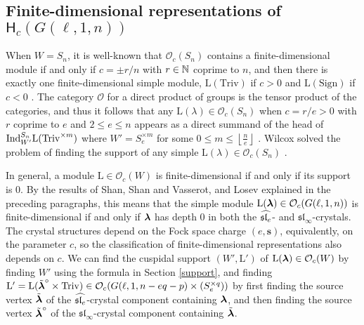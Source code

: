 \documentclass[12pt]{amsart}
\numberwithin{equation}{section}
\theoremstyle{definition}
\newcommand{\oh}{\mathcal{O}}
\newcommand{\el}{\mathrm{L}}
\newcommand{\slinf}{\mathfrak{sl}_\infty}
\newcommand{\mbs}{\mathbf{s}}
\newcommand{\triv}{\mathrm{Triv}}
\begin{document}
\subsection{Finite-dimensional representations of $\mathsf{H}_c(G(\ell,1,n))$}\label{findim}
When $W=S_n$, it is well-known that $\oh_c(S_n)$ contains a finite-dimensional module if and only if $c=\pm r/n$ with $r\in\mathbb{N}$ coprime to $n$, and then there is exactly one finite-dimensional simple module, $\el(\triv)$ if $c>0$ and $\el(\mathrm{Sign})$ if $c<0$ \cite{BEG}. The category $\oh$ for a direct product of groups is the tensor product of the categories, and thus it follows that any $\el(\lambda)\in\oh_c(S_n)$ when $c=r/e>0$ with $r$ coprime to $e$ and $2\leq e\leq n$ appears as a direct summand of the head of $\Ind_{W'}^{S_n}\el(\triv^{\times m})$ where $W'=S_e^{\times m}$ for some $0\leq m\leq \left\lfloor\frac{n}{e}\right\rfloor$ \cite{BezrukavnikovEtingof}. %
Wilcox solved the problem of finding the support of any simple $\el(\lambda)\in\oh_c(S_n)$ \cite{Wilcox}.

In general, a module $\el\in\oh_c(W)$ is finite-dimensional if and only if its support is $0$. By the results of Shan, Shan and Vasserot, and Losev explained in the preceding paragraphs, this means that the simple module $\el(\bla)\in\oh_c(G(\ell,1,n))$ is finite-dimensional if and only if $\boldsymbol{\lambda}$ has depth $0$ in both the $\widehat{\mathfrak{sl}_e}$- and $\slinf$-crystals. The crystal structures depend on the Fock space charge $(e,\mbs)$, equivalently, on the parameter $c$, so the classification of finite-dimensional representations also depends on $c$. We can find the cuspidal support $(W',\el')$ of $\el(\bla)\in\oh_c(W)$ by finding $W'$ using the formula in Section \ref{support}, and finding $\el'=\el(\tilde{\bla}^\circ\times\triv)\in\oh_c(G(\ell,1,n-eq-p)\times (S_e^{\times q}))$ by first finding the source vertex $\tilde{\boldsymbol{\lambda}}$ of the $\widehat{\mathfrak{sl}_e}$-crystal component containing $\boldsymbol{\lambda}$, and then finding the source vertex $\tilde{\boldsymbol{\lambda}}^\circ$ of the $\slinf$-crystal component containing $\tilde{\boldsymbol{\lambda}}$. 
\end{document}
